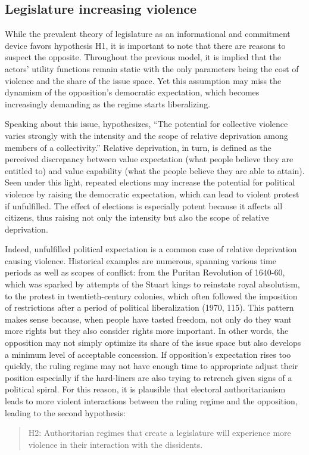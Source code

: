 \subsection{Legislature increasing violence}
While the prevalent theory of legislature as an informational and commitment device favors hypothesis H1, it is important to note that there are reasons to suspect the opposite. Throughout the previous model, it is implied that the actors' utility functions remain static with the only parameters being the cost of violence and the share of the issue space. Yet this assumption may miss the dynamism of the opposition's democratic expectation, which becomes increasingly demanding as the regime starts liberalizing.

Speaking about this issue, \citet[24]{Gurr1970} hypothesizes, ``The potential for collective violence varies strongly with the intensity and the scope of relative deprivation among members of a collectivity.'' Relative deprivation, in turn, is defined as the perceived discrepancy between value expectation (what people believe they are entitled to) and value capability (what the people believe they are able to attain). Seen under this light, repeated elections may increase the potential for political violence by raising the democratic expectation, which can lead to violent protest if unfulfilled. The effect of elections is especially potent because it affects all citizens, thus raising not only the intensity but also the scope of relative deprivation.

Indeed, unfulfilled political expectation is a common case of relative deprivation causing violence. Historical examples are numerous, spanning various time periods as well as scopes of conflict: from the Puritan Revolution of 1640-60, which was sparked by attempts of the Stuart kings to reinstate royal absolutism, to the protest in twentieth-century colonies, which often followed the imposition of restrictions after a period of political liberalization (1970, 115). This pattern makes sense because, when people have tasted freedom, not only do they want more rights but they also consider rights more important. In other words, the opposition may not simply optimize its share of the issue space but also develops a minimum level of acceptable concession. If opposition’s expectation rises too quickly, the ruling regime may not have enough time to appropriate adjust their position especially if the hard-liners are also trying to retrench given signs of a political spiral. For this reason, it is plausible that electoral authoritarianism leads to more violent interactions between the ruling regime and the opposition, leading to the second hypothesis:

\begin{quote}
H2: Authoritarian regimes that create a legislature will experience more violence in their interaction with the dissidents.
\end{quote}